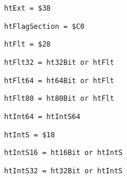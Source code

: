 \begin{verbatim}
htExt = $38
\end{verbatim}
\label{thoriumcore:thorium:htext}



\begin{verbatim}
htFlagSection = $C0
\end{verbatim}
\label{thoriumcore:thorium:htflagsection}



\begin{verbatim}
htFlt = $28
\end{verbatim}
\label{thoriumcore:thorium:htflt}



\begin{verbatim}
htFlt32 = ht32Bit or htFlt
\end{verbatim}
\label{thoriumcore:thorium:htflt32}



\begin{verbatim}
htFlt64 = ht64Bit or htFlt
\end{verbatim}
\label{thoriumcore:thorium:htflt64}



\begin{verbatim}
htFlt80 = ht80Bit or htFlt
\end{verbatim}
\label{thoriumcore:thorium:htflt80}



\begin{verbatim}
htInt64 = htIntS64
\end{verbatim}
\label{thoriumcore:thorium:htint64}



\begin{verbatim}
htIntS = $18
\end{verbatim}
\label{thoriumcore:thorium:htints}



\begin{verbatim}
htIntS16 = ht16Bit or htIntS
\end{verbatim}
\label{thoriumcore:thorium:htints16}



\begin{verbatim}
htIntS32 = ht32Bit or htIntS
\end{verbatim}
\label{thoriumcore:thorium:htints32}



